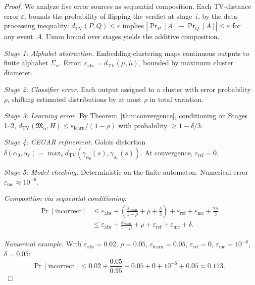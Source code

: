 \documentclass[11pt]{article}
\begin{document}
\begin{proof}
We analyze five error sources as sequential composition.
Each TV-distance error $\varepsilon_i$ bounds the probability
of flipping the verdict at stage~$i$, by the data-processing
inequality: $d_{\mathrm{TV}}(P, Q) \le \varepsilon$ implies
$|\Pr_P[A] - \Pr_Q[A]| \le \varepsilon$ for any event~$A$.
Union bound over stages yields the additive composition.

\emph{Stage 1: Alphabet abstraction.}
Embedding clustering maps continuous outputs to finite alphabet
$\Sigma_\alpha$.  Error:
$\varepsilon_{\mathrm{abs}} = d_{\mathrm{TV}}(\mu, \hat{\mu})$,
bounded by maximum cluster diameter.

\emph{Stage 2: Classifier error.}
Each output assigned to a cluster with error probability $\rho$,
shifting estimated distributions by at most $\rho$ in total variation.

\emph{Stage 3: Learning error.}
By Theorem~\ref{thm:convergence}, conditioning on Stages 1--2,
$d_{\mathrm{TV}}(\mathfrak{M}_\alpha, H) \le
\varepsilon_{\mathrm{learn}} / (1 - \rho)$ with probability
$\ge 1 - \delta/3$.

\emph{Stage 4: CEGAR refinement.}
Galois distortion $\delta(\alpha_0, \alpha_r) = \max_s
d_{\mathrm{TV}}(\gamma_{\alpha_0}(s), \gamma_{\alpha_r}(s))$.
At convergence, $\varepsilon_{\mathrm{ref}} = 0$.

\emph{Stage 5: Model checking.}
Deterministic on the finite automaton.  Numerical error
$\varepsilon_{\mathrm{mc}} \approx 10^{-6}$.

\emph{Composition via sequential conditioning:}
\begin{align*}
\Pr[\text{incorrect}] &\le
  \varepsilon_{\mathrm{abs}} +
  \left(\frac{\varepsilon_{\mathrm{learn}}}{1-\rho} + \rho + \frac{\delta}{3}\right) +
  \varepsilon_{\mathrm{ref}} +
  \varepsilon_{\mathrm{mc}} + \frac{2\delta}{3} \\
  &\le \varepsilon_{\mathrm{abs}} +
  \frac{\varepsilon_{\mathrm{learn}}}{1-\rho} + \rho +
  \varepsilon_{\mathrm{ref}} +
  \varepsilon_{\mathrm{mc}} + \delta.
\end{align*}

\emph{Numerical example.}  With $\varepsilon_{\mathrm{abs}} = 0.02$,
$\rho = 0.05$, $\varepsilon_{\mathrm{learn}} = 0.05$,
$\varepsilon_{\mathrm{ref}} = 0$, $\varepsilon_{\mathrm{mc}} = 10^{-6}$,
$\delta = 0.05$:
\[
  \Pr[\text{incorrect}] \le 0.02 + \frac{0.05}{0.95} + 0.05 + 0 + 10^{-6} + 0.05
  \approx 0.173.
\]
\end{proof}
\end{document}
